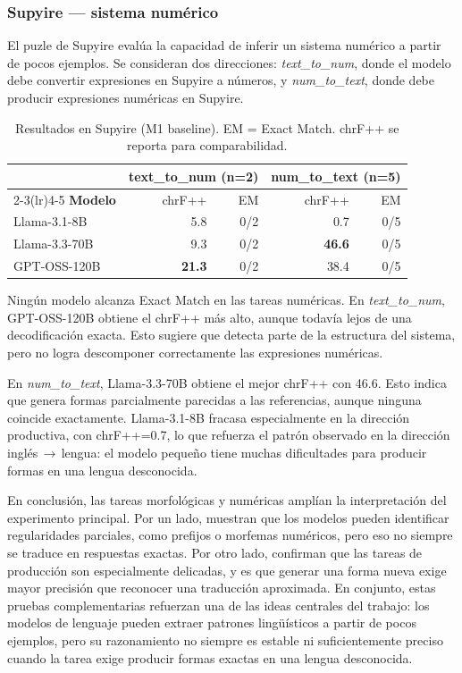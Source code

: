 \subsubsection*{Supyire — sistema numérico}

El puzle de Supyire evalúa la capacidad de inferir un sistema numérico a partir de pocos ejemplos. Se consideran dos direcciones: \textit{text\_to\_num}, donde el modelo debe convertir expresiones en Supyire a números, y \textit{num\_to\_text}, donde debe producir expresiones numéricas en Supyire.

\begin{table}[h]
	\centering
	\caption{Resultados en Supyire (M1 baseline). EM = Exact Match. chrF++ se reporta para comparabilidad.}
	\label{tab:supyire}
	\begin{tabular}{lrrrr}
		\toprule
		& \multicolumn{2}{c}{\textbf{text\_to\_num} (n=2)}
		& \multicolumn{2}{c}{\textbf{num\_to\_text} (n=5)} \\
		\cmidrule(lr){2-3}\cmidrule(lr){4-5}
		\textbf{Modelo} & chrF++ & EM & chrF++ & EM \\
		\midrule
		Llama-3.1-8B  &  5.8 & 0/2 &  0.7 & 0/5 \\
		Llama-3.3-70B &  9.3 & 0/2 & \textbf{46.6} & 0/5 \\
		GPT-OSS-120B  & \textbf{21.3} & 0/2 & 38.4 & 0/5 \\
		\bottomrule
	\end{tabular}
\end{table}

Ningún modelo alcanza Exact Match en las tareas numéricas. En \textit{text\_to\_num}, GPT-OSS-120B obtiene el chrF++ más alto, aunque todavía lejos de una decodificación exacta. Esto sugiere que detecta parte de la estructura del sistema, pero no logra descomponer correctamente las expresiones numéricas.

En \textit{num\_to\_text}, Llama-3.3-70B obtiene el mejor chrF++ con 46.6. Esto indica que genera formas parcialmente parecidas a las referencias, aunque ninguna coincide exactamente. Llama-3.1-8B fracasa especialmente en la dirección productiva, con chrF++=0.7, lo que refuerza el patrón observado en la dirección inglés\,$\rightarrow$\,lengua: el modelo pequeño tiene muchas dificultades para producir formas en una lengua desconocida.

\vspace{1cm}

En conclusión, las tareas morfológicas y numéricas amplían la interpretación del experimento principal. Por un lado, muestran que los modelos pueden identificar regularidades parciales, como prefijos o morfemas numéricos, pero eso no siempre se traduce en respuestas exactas. Por otro lado, confirman que las tareas de producción son especialmente delicadas, y es que generar una forma nueva exige mayor precisión que reconocer una traducción aproximada. En conjunto, estas pruebas complementarias refuerzan una de las ideas centrales del trabajo: los modelos de lenguaje pueden extraer patrones lingüísticos a partir de pocos ejemplos, pero su razonamiento no siempre es estable ni suficientemente preciso cuando la tarea exige producir formas exactas en una lengua desconocida.

